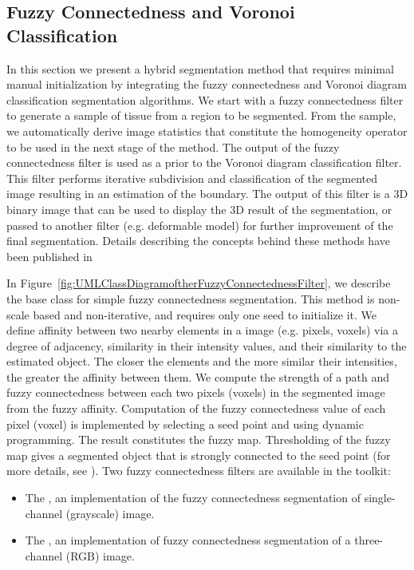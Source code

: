 \subsection{Fuzzy Connectedness and Voronoi Classification}
\label{sec:HybridMethod1}
In this section we present a hybrid segmentation method that requires
minimal manual initialization by integrating the fuzzy connectedness and
Voronoi diagram classification segmentation algorithms. We start with a fuzzy
connectedness filter to generate a sample of tissue from a region to be
segmented. From the sample, we automatically derive image statistics that
constitute the homogeneity operator to be used in the next stage of the
method. The output of the fuzzy connectedness filter is used as a prior to
the Voronoi diagram classification filter. This filter performs iterative
subdivision and classification of the segmented image resulting in an
estimation of the boundary. The output of this filter is a 3D binary image
that can be used to display the 3D result of the segmentation, or passed to
another filter (e.g. deformable model) for further improvement of the final
segmentation. Details describing the concepts behind these methods have been
published in
\cite{Angelini2002,Udupa2002,Jin2002,Imielinska2001,Imielinska2000a,Imielinska2000b}

In Figure~\ref{fig:UMLClassDiagramoftherFuzzyConnectednessFilter}, we
describe the base class for simple fuzzy connectedness segmentation. This
method is non-scale based and non-iterative, and requires only one seed to
initialize it. We define affinity between two nearby elements in a image
(e.g. pixels, voxels) via a degree of adjacency, similarity in their
intensity values, and their similarity to the estimated object.  The closer
the elements and the more similar their intensities, the greater the affinity
between them. We compute the strength of a path and fuzzy connectedness
between each two pixels (voxels) in the segmented image from the fuzzy
affinity.  Computation of the fuzzy connectedness value of each pixel (voxel)
is implemented by selecting a seed point and using dynamic programming. The
result constitutes the fuzzy map. Thresholding of the fuzzy map gives a
segmented object that is strongly connected to the seed point (for more
details, see \cite{Udupa1996}). Two fuzzy connectedness filters are available
in the toolkit:

\begin{itemize}
\item The , an implementation of the
fuzzy connectedness segmentation of single-channel (grayscale) image.
\item The , an implementation
of fuzzy connectedness segmentation of a three-channel (RGB) image.
\end{itemize}

